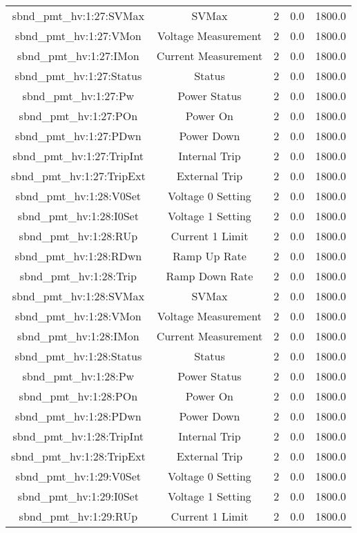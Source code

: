 \begin{table}[ptb]
\begin{tabular}{c | c c c c}
sbnd_pmt_hv:1:27:SVMax & SVMax & 2 & 0.0 & 1800.0\\ 
sbnd_pmt_hv:1:27:VMon & Voltage Measurement & 2 & 0.0 & 1800.0\\ 
sbnd_pmt_hv:1:27:IMon & Current Measurement & 2 & 0.0 & 1800.0\\ 
sbnd_pmt_hv:1:27:Status & Status & 2 & 0.0 & 1800.0\\ 
sbnd_pmt_hv:1:27:Pw & Power Status & 2 & 0.0 & 1800.0\\ 
sbnd_pmt_hv:1:27:POn & Power On & 2 & 0.0 & 1800.0\\ 
sbnd_pmt_hv:1:27:PDwn & Power Down & 2 & 0.0 & 1800.0\\ 
sbnd_pmt_hv:1:27:TripInt & Internal Trip & 2 & 0.0 & 1800.0\\ 
sbnd_pmt_hv:1:27:TripExt & External Trip & 2 & 0.0 & 1800.0\\ 
sbnd_pmt_hv:1:28:V0Set & Voltage 0 Setting & 2 & 0.0 & 1800.0\\ 
sbnd_pmt_hv:1:28:I0Set & Voltage 1 Setting & 2 & 0.0 & 1800.0\\ 
sbnd_pmt_hv:1:28:RUp & Current 1 Limit & 2 & 0.0 & 1800.0\\ 
sbnd_pmt_hv:1:28:RDwn & Ramp Up Rate & 2 & 0.0 & 1800.0\\ 
sbnd_pmt_hv:1:28:Trip & Ramp Down Rate & 2 & 0.0 & 1800.0\\ 
sbnd_pmt_hv:1:28:SVMax & SVMax & 2 & 0.0 & 1800.0\\ 
sbnd_pmt_hv:1:28:VMon & Voltage Measurement & 2 & 0.0 & 1800.0\\ 
sbnd_pmt_hv:1:28:IMon & Current Measurement & 2 & 0.0 & 1800.0\\ 
sbnd_pmt_hv:1:28:Status & Status & 2 & 0.0 & 1800.0\\ 
sbnd_pmt_hv:1:28:Pw & Power Status & 2 & 0.0 & 1800.0\\ 
sbnd_pmt_hv:1:28:POn & Power On & 2 & 0.0 & 1800.0\\ 
sbnd_pmt_hv:1:28:PDwn & Power Down & 2 & 0.0 & 1800.0\\ 
sbnd_pmt_hv:1:28:TripInt & Internal Trip & 2 & 0.0 & 1800.0\\ 
sbnd_pmt_hv:1:28:TripExt & External Trip & 2 & 0.0 & 1800.0\\ 
sbnd_pmt_hv:1:29:V0Set & Voltage 0 Setting & 2 & 0.0 & 1800.0\\ 
sbnd_pmt_hv:1:29:I0Set & Voltage 1 Setting & 2 & 0.0 & 1800.0\\ 
sbnd_pmt_hv:1:29:RUp & Current 1 Limit & 2 & 0.0 & 1800.0\\ 

\end{tabular}
\end{table}
